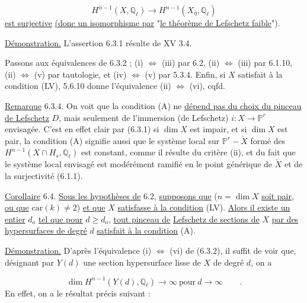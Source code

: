 \begin{equation*}
H^{n-1}(X,\mathbb{Q}_\ell) \longrightarrow H^{n-1}(X_{\bar{\eta}},\mathbb{Q}_\ell)
\end{equation*}
\underline{est surjective} \underline{(donc un isomorphisme par} "\underline{le théorème de Lefschetz faible}").

\underline{Démonstration.}  L'assertion 6.3.1  résulte de XV 3.4.

Passons aux équivalences de 6.3.2 ; (i) $\Longleftrightarrow$ (iii) par 6.2, (ii) $\Longleftrightarrow$ (iii) par 6.1.10, (ii) $\Longleftrightarrow$ (v) par tautologie, et (iv) $\Longleftrightarrow$ (v) par 5.3.4. Enfin, si $X$ satisfait à la condition (LV), 5.6.10 donne l'équivalence (ii) $\Longleftrightarrow$ (vi), cqfd.

\underline{Remarque} 6.3.4. On voit que la condition (A) ne \underline{dépend pas du choix du pinceau de Lefschetz} $D$, mais seulement de l'immersion (de Lefschetz) $i : X \longrightarrow \mathbb{P}^r$ envisagée. C'est en effet clair par (6.3.1) si $\dim X$ est impair, et si $\dim X$ est pair, la condition (A) signifie aussi que le système local sur $\mathbb{P}^r - \check{X}$ formé des $H^{n-1}(X \cap H_s, \mathbb{Q}_\ell)$ est constant, comme il résulte du critère (ii), et du fait que le système local envisagé est modérément ramifié en le point générique de $\check{X}$ et de la surjectivité (6.1.1).

\underline{Corollaire} 6.4.  \underline{Sous les hypothèses de} 6.2, \underline{supposons que} ($n = \dim X$ \underline{soit pair}, \underline{ou que} $\mathrm{car}(k) \neq 2$) \underline{et que} $X$ \underline{satisfasse à la condition} (LV). \underline{Alors il existe un entier} $d_o$ \underline{tel que pour} $d \geq d_o$, \underline{tout pinceau de}
\underline{Lefschetz de sections de} $X$ \underline{par des hypersurfaces de degré} $d$ \underline{satisfait à la condition} (A).

\underline{Démonstration.}  D'après l'équivalence (i) $\Longleftrightarrow$ (vi) de (6.3.2), il suffit de voir que, désignant par $Y(d)$ une section hypersurface lisse de $X$ de degré $d$, on a

\begin{equation}\tag{6.4.1}
\dim H^{n-1}(Y(d),\mathbb{Q}_\ell) \longrightarrow \infty \ \mbox{pour} \ d \longrightarrow \infty \qquad .
\end{equation}
En effet, on a le résultat précis suivant :


